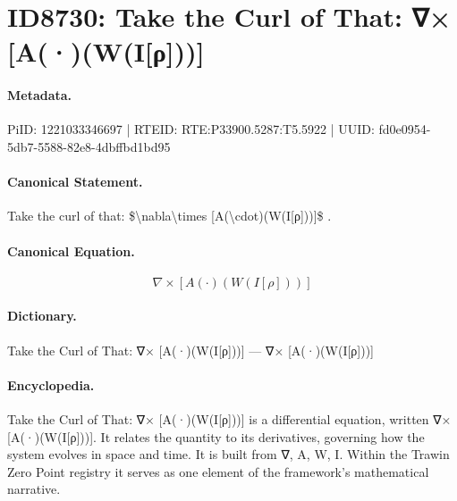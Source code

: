 \section*{ID8730: Take the Curl of That: ∇× [A(·)(W(I[ρ]))]}
\paragraph{Metadata.}
PiID: 1221033346697 | RTEID: RTE:P33900.5287:T5.5922 | UUID: fd0e0954-5db7-5588-82e8-4dbffbd1bd95

\paragraph{Canonical Statement.}
Take the curl of that: \$\textbackslash{}nabla\textbackslash{}times [A(\textbackslash{}cdot)(W(I[ρ]))]\$ .

\paragraph{Canonical Equation.}
\[
\nabla\times [A(\cdot)(W(I[ρ]))]
\]

\paragraph{Dictionary.}
Take the Curl of That: ∇× [A(·)(W(I[ρ]))] — ∇× [A(·)(W(I[ρ]))]

\paragraph{Encyclopedia.}
Take the Curl of That: ∇× [A(·)(W(I[ρ]))] is a differential equation, written ∇× [A(·)(W(I[ρ]))]. It relates the quantity to its derivatives, governing how the system evolves in space and time. It is built from ∇, A, W, I. Within the Trawin Zero Point registry it serves as one element of the framework's mathematical narrative.
